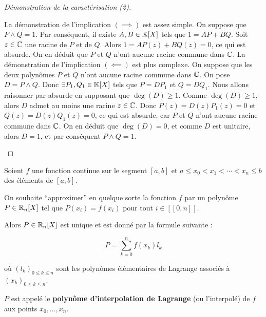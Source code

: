 \documentclass[12pt,a4paper]{report}
\begin{document}
\begin{proof}[Démonstration de la caractérisation (2)]
    \begin{outline}
        \1 La démonstration de l'implication $(\implies)$ est assez simple.
        \2 On suppose que $P \wedge Q = 1$. 
        \2 Par conséquent, il existe $A,B \in \mathbb{K}[X]$ tels que $1 = AP + BQ$.
        \2 Soit $z \in \mathbb{C}$ une racine de $P$ et de $Q$. Alors $1 = AP(z) + BQ(z) = 0$, ce qui est absurde.
        \2 On en déduit que $P$ et $Q$ n'ont aucune racine commune dans $\mathbb{C}$.
        \1 La démonstration de l'implication $(\impliedby)$ est plus complexe. %
        \2 On suppose que les deux polynômes $P$ et $Q$ n'ont aucune racine commune dans $\mathbb{C}$.
        \2 On pose $D = P \wedge Q$.
        \2 Donc $\exists P_1, Q_1 \in \mathbb{K}[X]$ tels que $P = D P_1$ et $Q = D Q_1$.
        \2 Nous allons raisonner par absurde en supposant que $\deg(D) \ge 1$.
        \2 Comme $\deg(D) \ge 1$, alors $D$ admet au moins une racine $z \in \mathbb{C}$.
        \2 Donc $P(z) = D(z) P_1(z) = 0$ et $Q(z) = D(z) Q_1(z) = 0$, ce qui est absurde, car $P$ et $Q$ n'ont aucune racine commune dans $\mathbb{C}$.
        \2 On en déduit que $\deg(D) = 0$, et comme $D$ est unitaire, alors $D = 1$, et par conséquent $P \wedge Q = 1$.
    \end{outline}
\end{proof}

\begin{theorem}
    Soient $f$ une fonction continue sur le segment $[a,b]$ et $a \le x_0 < x_1 < \cdots < x_n \le b$ des éléments de $[a,b]$.

    On souhaite ``approximer'' en quelque sorte la fonction $f$ par un polynôme $P \in \mathbb{R}_n[X]$ tel que $P(x_i) = f(x_i)$ pour tout $i \in [\![0,n]\!]$.

    Alors $P \in \mathbb{R}_n[X]$ est unique et est donné par la formule suivante :

    $$P = \sum_{k=0}^{n} f(x_k) l_k$$

    où $(l_k)_{0 \le k \le n}$ sont les polynômes élémentaires de Lagrange associés à $(x_k)_{0 \le k \le n}$.

    $P$ est appelé le \textbf{polynôme d'interpolation de Lagrange} (ou l'interpolé) de $f$ aux points $x_0,\dots,x_n$.
\end{theorem}
\end{document}

